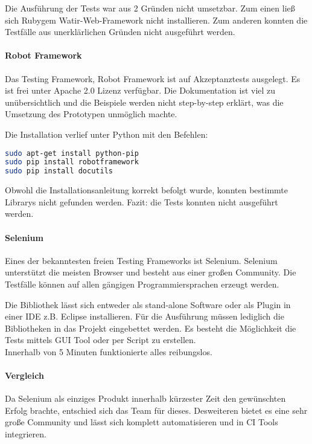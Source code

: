 Die Ausführung der Tests war aus 2 Gründen nicht umsetzbar. Zum einen ließ sich Rubygem Watir-Web-Framework nicht installieren. Zum anderen konnten die Testfälle aus unerklärlichen Gründen nicht ausgeführt werden.

\paragraph{Robot Framework}
Das Testing Framework, Robot Framework ist auf Akzeptanztests ausgelegt. Es ist frei unter Apache 2.0 Lizenz verfügbar. Die Dokumentation ist viel zu unübersichtlich und die Beispiele werden nicht step-by-step erklärt, was die Umsetzung des Prototypen unmöglich machte. \cite{ROBOTFRAMEWORK}

Die Installation verlief unter Python mit den Befehlen:
\begin{lstlisting}[caption={Installation von Robot Framework \cite{ROBOTFRAMEWORKINSTALL}}, language=bash]
sudo apt-get install python-pip
sudo pip install robotframework
sudo pip install docutils
\end{lstlisting}

Obwohl die Installationsanleitung korrekt befolgt wurde, konnten bestimmte Librarys nicht gefunden werden. Fazit: die Tests konnten nicht ausgeführt werden. 
\paragraph{Selenium}
Eines der bekanntesten freien Testing Frameworks ist Selenium. Selenium unterstützt die meisten Browser und besteht aus einer großen Community. Die Testfälle können auf allen gängigen Programmiersprachen erzeugt werden.

Die Bibliothek lässt sich entweder als stand-alone Software oder als Plugin in einer IDE z.B. Eclipse installieren. Für die Ausführung müssen lediglich die Bibliotheken in das Projekt eingebettet werden. Es besteht die Möglichkeit die Tests mittels GUI Tool oder per Script zu erstellen.\\
Innerhalb von 5 Minuten funktionierte alles reibungslos.

\paragraph{Vergleich}
Da Selenium als einziges Produkt innerhalb kürzester Zeit den gewünschten Erfolg brachte, entschied sich das Team für dieses. Desweiteren bietet es eine sehr große Community und lässt sich komplett automatisieren und in CI Tools integrieren.